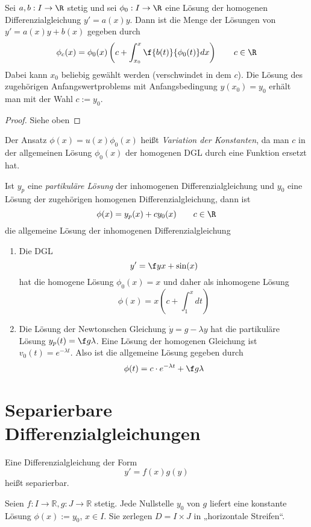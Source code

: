 \documentclass{mycourse}
\begin{document}
\begin{st}
	Sei $a,b:I \to \R$ stetig und sei $\phi_0 : I \to \R$ eine Lösung der homogenen Differenzialgleichung $y' = a(x) y$.
	Dann ist die Menge der Lösungen von $y' = a(x)y + b(x)$ gegeben durch
	\[
		\phi_c (x) = \phi_0(x) \left(c + \int_{x_0}^x \f {b(t)}{\phi_0(t)} dx\right) \qquad c\in \R
	\]
	Dabei kann $x_0$ beliebig gewählt werden (verschwindet in dem $c$).
	Die Lösung des zugehörigen Anfangswertproblems mit Anfangsbedingung $y(x_0) = y_0$ erhält man mit der Wahl $c := y_0$.
	\begin{proof}
		Siehe oben \fixme[unvollständig]
	\end{proof}
	\begin{note}
		Der Ansatz $\phi(x) = u(x) \phi_0(x)$ heißt \emph{Variation der Konstanten}, da man $c$ in der allgemeinen Lösung $\phi_0(x)$ der homogenen DGL durch eine Funktion ersetzt hat.

		Ist $y_p$ eine \emph{partikuläre Lösung} der inhomogenen Differenzialgleichung und $y_0$ eine Lösung der zugehörigen homogenen Differenzialgleichung, dann ist
		\[
			\phi(x) = y_p(x) + cy_0(x) \qquad c\in \R
		\]
		die allgemeine Lösung der inhomogenen Differenzialgleichung
	\end{note}
\end{st}

\begin{ex*}
	\begin{enumerate}[1)]
		\item
			Die DGL
			\[
				y' = \f yx + \sin(x)
			\]
			hat die homogene Lösung $\phi_0(x) = x$ und daher als inhomogene Lösung
			\[
				\phi(x) = x(c + \int_1^x dt)
			\]
		\item	
			Die Lösung der Newtonschen Gleichung $\dot y = g - \lambda y$ hat die partikuläre Lösung $y_p(t) = \f g\lambda$.
			Eine Lösung der homogenen Gleichung ist $v_0(t) = e^{-\lambda t}$.
			Also ist die allgemeine Lösung gegeben durch
			\[
				\phi(t) = c\cdot e^{-\lambda t} + \f g\lambda
			\]
	\end{enumerate}
\end{ex*}



\section{Separierbare Differenzialgleichungen}
Eine Differenzialgleichung der Form 
\[
y'=f(x)g(y)
\]
heißt separierbar.

Seien $f:I\to \mathbb R, g: J\to \mathbb{R}$ stetig.
Jede Nullstelle $y_0$ von $g$ liefert eine konstante Lösung $\phi(x):=y_0$, $x\in I$.
Sie zerlegen $D=I\times J$ in „horizontale Streifen“.
\end{document}
